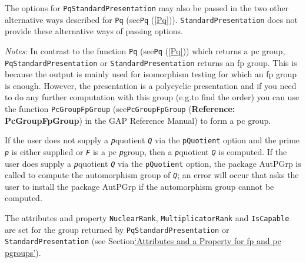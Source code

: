 \documentclass[a4paper,11pt]{report}
\begin{document}
{{{ The options for \texttt{PqStandardPresentation} may also be passed in the two other alternative ways described for \texttt{Pq} (see{\nobreakspace}\texttt{Pq} (\ref{Pq})). \texttt{StandardPresentation} does not provide these alternative ways of passing options. 

 \emph{Notes:} In contrast to the function \texttt{Pq} (see{\nobreakspace}\texttt{Pq} (\ref{Pq})) which returns a pc group, \texttt{PqStandardPresentation} or \texttt{StandardPresentation} returns an fp group. This is because the output is mainly used for isomorphism
testing for which an fp group is enough. However, the presentation is a
polycyclic presentation and if you need to do any further computation with
this group (e.g.{\nobreakspace}to find the order) you can use the function \texttt{PcGroupFpGroup} (see{\nobreakspace}\texttt{PcGroupFpGroup} (\textbf{Reference: PcGroupFpGroup}) in the \textsf{GAP} Reference Manual) to form a pc group. 

 If the user does not supply a \mbox{\texttt{\mdseries\slshape p}}\texttt{}quotient \mbox{\texttt{\mdseries\slshape Q}} via the \texttt{pQuotient} option and the prime \mbox{\texttt{\mdseries\slshape p}} is either supplied or \mbox{\texttt{\mdseries\slshape F}} is a pc \mbox{\texttt{\mdseries\slshape p}}\texttt{}group, then a \mbox{\texttt{\mdseries\slshape p}}\texttt{}quotient \mbox{\texttt{\mdseries\slshape Q}} is computed. If the user does supply a \mbox{\texttt{\mdseries\slshape p}}\texttt{}quotient \mbox{\texttt{\mdseries\slshape Q}} via the \texttt{pQuotient} option, the package \textsf{AutPGrp} is called to compute the automorphism group of \mbox{\texttt{\mdseries\slshape Q}}; an error will occur that asks the user to install the package \textsf{AutPGrp} if the automorphism group cannot be computed. 

 The attributes and property \texttt{NuclearRank}, \texttt{MultiplicatorRank} and \texttt{IsCapable} are set for the group returned by \texttt{PqStandardPresentation} or \texttt{StandardPresentation} (see Section{\nobreakspace}\hyperref[Attributes and a Property for fp and pc p-groups]{`Attributes and a Property for fp and pc p\texttt{}groups'}). 

}}}
\end{document}
